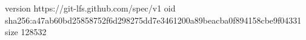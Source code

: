 version https://git-lfs.github.com/spec/v1
oid sha256:a47ab60bd25858752f6d298275dd7e3461200a89beacba0f894158cbe9f04331
size 128532

